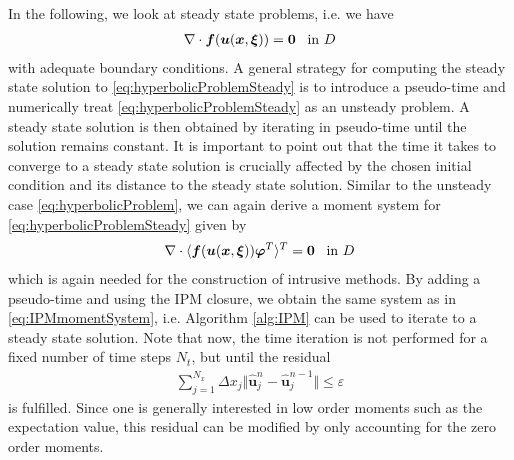 In the following, we look at steady state problems, i.e. we have
\begin{align}\label{eq:hyperbolicProblemSteady}
\nabla\cdot\bm{f}(\bm{u}(\bm{x},\bm{\xi})) = \bm{0} \enskip \text{ in } D
\end{align}
with adequate boundary conditions. A general strategy for computing the steady state solution to \eqref{eq:hyperbolicProblemSteady} is to introduce a pseudo-time and numerically treat \eqref{eq:hyperbolicProblemSteady} as an unsteady problem. A steady state solution is then obtained by iterating in pseudo-time until the solution remains constant. It is important to point out that the time it takes to converge to a steady state solution is crucially affected by the chosen initial condition and its distance to the steady state solution.
Similar to the unsteady case \eqref{eq:hyperbolicProblem}, we can again derive a moment system for \eqref{eq:hyperbolicProblemSteady} given by
\begin{align}\label{eq:MomentSystemSteady}
\nabla\cdot\langle\bm{f}(\bm{u}(\bm{x},\bm{\xi}))\bm{\varphi}^T\rangle^T = \bm{0} \enskip \text{ in } D
\end{align}
which is again needed for the construction of intrusive methods. By adding a pseudo-time and using the IPM closure, we obtain the same system as in \eqref{eq:IPMmomentSystem}, i.e. Algorithm \ref{alg:IPM} can be used to iterate to a steady state solution. Note that now, the time iteration is not performed for a fixed number of time steps $N_t$, but until the residual
\begin{align}\label{eq:residualUnsteady}
\sum_{j = 1}^{N_x} \Delta x_j \Vert \bm{\hat{u}}_j^n - \bm{\hat{u}}_j^{n-1} \Vert \leq \varepsilon
\end{align}
is fulfilled. Since one is generally interested in low order moments such as the expectation value, this residual can be modified by only accounting for the zero order moments.

